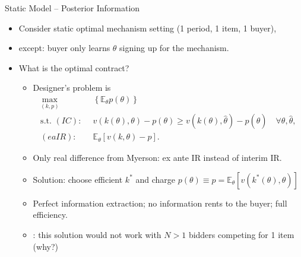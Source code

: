 \documentclass[english,10pt
,aspectratio=169
]{beamer}
\begin{document}
\begin{frame}{Static Model -- Posterior Information}
\begin{example}
	\begin{itemize}
		\item Consider static optimal mechanism setting (1 period, 1 item, 1 buyer),
		\item \alert{except}: buyer only learns $\theta$  signing up for the mechanism. 
		\item What is the optimal contract? 
		
		\pause
		\begin{itemize}
			\item Designer's problem is
			\begin{align*}
				\max_{(k,p)} & \left\{ \mathbb{E}_\theta p(\theta) \right\}
				\\
				\text{s.t. } (IC):\enspace & v(k(\theta),\theta) - p(\theta) \geq v(k(\theta),\hat{\theta}) - p(\hat{\theta}) \quad \forall \theta, \hat{\theta},
				\\
				(eaIR):\enspace & \mathbb{E}_\theta \left[v(k,\theta) - p\right] .
			\end{align*}
			\item Only real difference from Myerson: ex ante IR instead of interim IR.
			\item \alert{Solution}: choose efficient $k^*$ and charge $p(\theta) \equiv p = \mathbb{E}_\theta \left[v(k^*(\theta),\theta)\right]$
			\item Perfect information extraction; no information rents to the buyer; full efficiency.
			\item {}: this solution would not work with $N>1$ bidders competing for 1 item (why?)
		\end{itemize}
	\end{itemize}
\end{example}
\end{frame}
\end{document}
